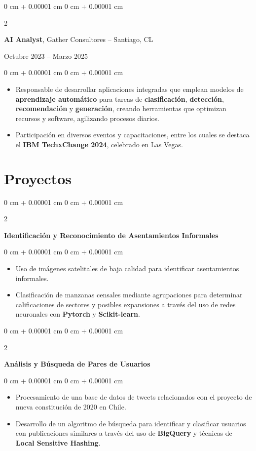 \documentclass[10pt, letterpaper]{article}
\newenvironment{highlights}{
    \begin{itemize}[
        topsep=0.10 cm,
        parsep=0.10 cm,
        partopsep=0pt,
        itemsep=0pt,
        leftmargin=0 cm + 10pt
    ]
}{
    \end{itemize}
} %
\newenvironment{onecolentry}{
    \begin{adjustwidth}{
        0 cm + 0.00001 cm
    }{
        0 cm + 0.00001 cm
    }
}{
    \end{adjustwidth}
} %
\newenvironment{twocolentry}[2][]{
    \onecolentry
    \def\secondColumn{#2}
    \setcolumnwidth{\fill, 4.5 cm}
    \begin{paracol}{2}
}{
    \switchcolumn \raggedleft \secondColumn
    \end{paracol}
    \endonecolentry
} %
\begin{document}
\begin{twocolentry}{Octubre 2023 – Marzo 2025}
    \textbf{AI Analyst}, Gather Consultores -- Santiago, CL
\end{twocolentry}

\vspace{0.10 cm}
\begin{onecolentry}
    \begin{highlights}
    \item Responsable de desarrollar aplicaciones integradas que emplean modelos de \textbf{aprendizaje automático} para tareas de \textbf{clasificación}, \textbf{detección}, \textbf{recomendación} y \textbf{generación}, creando herramientas que optimizan recursos y software, agilizando procesos diarios.
    \item Participación en diversos eventos y capacitaciones, entre los cuales se destaca el \textbf{IBM TechxChange 2024}, celebrado en Las Vegas.
    \end{highlights}
\end{onecolentry}

\section{Proyectos}

\begin{twocolentry}{
}
    \textbf{Identificación y Reconocimiento de Asentamientos Informales}
\end{twocolentry}

\vspace{0.10 cm}
\begin{onecolentry}
    \begin{highlights}
    \item Uso de imágenes satelitales de baja calidad para identificar asentamientos informales.
    \item Clasificación de manzanas censales mediante agrupaciones para determinar calificaciones de sectores y posibles expansiones a través del uso de redes neuronales con \textbf{Pytorch} y \textbf{Scikit-learn}.
    \end{highlights}
\end{onecolentry}
\vspace{0.2 cm}
\begin{twocolentry}{
}

    \textbf{Análisis y Búsqueda de Pares de Usuarios}
\end{twocolentry}

\vspace{0.10 cm}
\begin{onecolentry}
    \begin{highlights}
    \item Procesamiento de una base de datos de tweets relacionados con el proyecto de nueva constitución de 2020 en Chile.
    \item Desarrollo de un algoritmo de búsqueda para identificar y clasificar usuarios con publicaciones similares a través del uso de \textbf{BigQuery} y técnicas de \textbf{Local Sensitive Hashing}.
    \end{highlights}
\end{onecolentry}
\vspace{0.2 cm}
\end{document}
